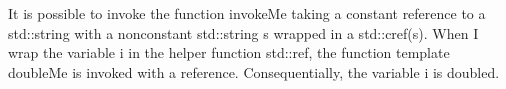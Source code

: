 It is possible to invoke the function invokeMe taking a constant reference to a std::string with a nonconstant std::string s wrapped in a std::cref(s). When I wrap the variable i in the helper function std::ref, the function template doubleMe is invoked with a reference. Consequentially, the variable i is doubled.


































